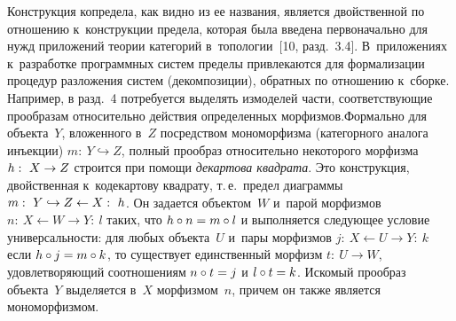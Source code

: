 \begin{multicols}{2}
 Конструкция копредела, как видно из ее названия, является двойственной по
отношению к~конструкции предела, которая была введена первоначально для
нужд приложений теории категорий в~топологии~[10, разд.~3.4].
В~приложениях к~разработке программных систем пределы привлекаются для
формализации процедур разложения систем (декомпозиции), обратных по
отношению к~сборке. Например, в разд.~4 потребуется выделять из\linebreak моделей
части, соответствующие прообразам относительно действия определенных
морфизмов.\linebreak Формально для объекта~$Y$, вложенного в~$Z$ посредством
мономорфизма (категорного аналога инъекции) $m:\ Y\hookrightarrow Z$,
полный прообраз относительно некоторого морфизма $h:\ X\hm\to Z$ строится
при помощи \textit{декартова квадрата}. Это конструкция, двойственная
к~кодекартову квадрату, т.\,е.\ предел диаграммы $m:\ Y\hm\hookrightarrow
Z\leftarrow X:\ h$. Он задается объектом~$W$ и~парой морфизмов $n:\
X\leftarrow W\to Y:\ l$ таких, что $h \circ n \hm= m \circ l$ и выполняется
следующее условие универсальности: для любых объекта~$U$ и~пары
морфизмов $j:\ X \leftarrow U \rightarrow Y:\ k$ если $h \circ j\hm = m \circ k$, то
существует единственный морфизм $t:\ U \to W$, удовлетворяющий
соотношениям $n \circ t \hm= j$ и $l \circ t \hm= k$. Искомый прообраз
объекта~$Y$ выделяется в~$X$ морфизмом~$n$, причем он также является
мономорфизмом.

\columnbreak

\vspace*{-3pt}
 \begin{center}
 \mbox{%
 \epsfxsize=49.166mm
 }
 \end{center}
 \vspace*{3pt}



\end{multicols}
